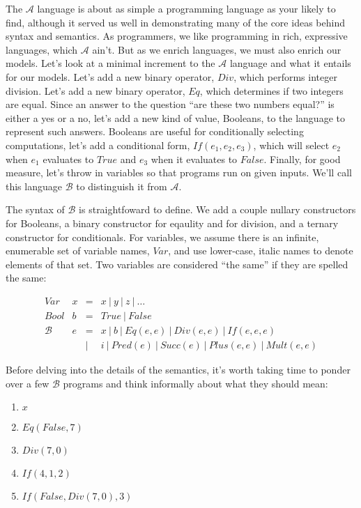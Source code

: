 \documentclass[11pt]{article}
\newcommand\mint{i}
\newcommand\mbool{b}
\newcommand\Plus{\mathit{Plus}}
\newcommand\Mult{\mathit{Mult}}
\newcommand\Succ{\mathit{Succ}}
\newcommand\Pred{\mathit{Pred}}
\newcommand\Eq{\mathit{Eq}}
\newcommand\True{\mathit{True}}
\newcommand\False{\mathit{False}}
\newcommand\If{\mathit{If}}
\newcommand\Div{\mathit{Div}}
\newcommand\Arith{\mathcal{A}}
\newcommand\Barith{\mathcal{B}}
\newcommand\Var{\mathit{Var}}
\newcommand{\mvar}{x}
\newcommand\s[1]{\mathit{#1}}
\begin{document}
The $\Arith$ language is about as simple a programming language as
your likely to find, although it served us well in demonstrating many
of the core ideas behind syntax and semantics.
%
As programmers, we like programming in rich, expressive languages, 
which $\Arith$ ain't.
%
But as we enrich languages, we must also enrich our models.
%
Let's look at a minimal increment to the $\Arith$ language and what it
entails for our models.
%
Let's add a new binary operator, $\Div$, which performs integer
division.
%
Let's add a new binary operator, $\Eq$, which determines if two
integers are equal.
%
Since an answer to the question ``are these two numbers equal?'' is
either a yes or a no, let's add a new kind of value, Booleans, to the
language to represent such answers.
%
Booleans are useful for conditionally selecting computations, let's
add a conditional form, $\If(e_1,e_2,e_3)$, which will select $e_2$
when $e_1$ evaluates to $\True$ and $e_3$ when it evaluates to
$\False$.  Finally, for good measure, let's throw in variables so that
programs run on given inputs.  We'll call this language $\Barith$ to
distinguish it from $\Arith$.

The syntax of $\Barith$ is straightfoward to define.  We add a couple
nullary constructors for Booleans, a binary constructor for eqaulity
and for division, and a ternary constructor for conditionals.  For
variables, we assume there is an infinite, enumerable set of variable
names, $\Var$, and use lower-case, italic names to denote elements of
that set.  Two variables are considered ``the same'' if they are
spelled the same:

\[
\begin{array}{llcl}
\mathit{Var} & \mvar & = & \s{x}\ |\ \s{y}\ |\ \s{z}\ |\ \dots \\
\mathit{Bool} & \mbool & = & \True\ |\ \False\\
\Barith & e & = & \mvar\ |\ \mbool\ |\ \Eq(e,e)\ |\ \Div(e,e)\ |\ \If(e,e,e)\\
        &   & | & \mint\ |\ \Pred(e)\ |\ \Succ(e)\ |\ \Plus(e,e)\ |\ \Mult(e,e)
\end{array}
\]



Before delving into the details of the semantics, it's worth taking
time to ponder over a few $\Barith$ programs and think informally
about what they should mean:

\begin{enumerate}\setlength{\itemsep}{0pt}
\item $\s{x}$
\item $\Eq(\False,7)$
\item $\Div(7,0)$
\item $\If(4,1,2)$
\item $\If(\False,\Div(7,0),3)$
\end{enumerate}
\end{document}
